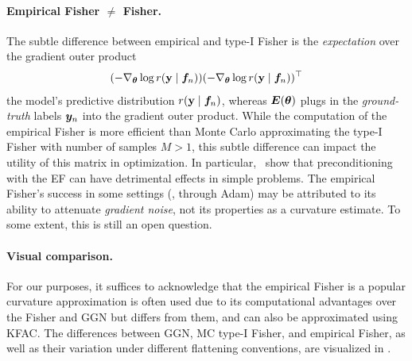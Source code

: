 \paragraph{Empirical Fisher $\neq$ Fisher.}
The subtle difference between empirical and type-I Fisher is the \emph{expectation} over the gradient outer product
\begin{align*}
  (-\nabla_{{\bm{\theta}}} \log r({\mathbf{y}} \mid {\bm{f}}_n))
  (-\nabla_{{\bm{\theta}}} \log r({\mathbf{y}} \mid {\bm{f}}_n))^{\top}
\end{align*}
\wrt the model's predictive distribution $r({\mathbf{y}} \mid {\bm{f}}_n)$, whereas ${\bm{E}}({\bm{\theta}})$ plugs in the \emph{ground-truth} labels ${\bm{y}}_n$ into the gradient outer product.
While the computation of the empirical Fisher is more efficient than Monte Carlo approximating the type-I Fisher with number of samples $M > 1$, this subtle difference can impact the utility of this matrix in optimization.
In particular,~\citet{kunstner2019limitations} show that preconditioning with the EF can have detrimental effects in simple problems.
The empirical Fisher's success in some settings (\eg, through Adam) may be attributed to its ability to attenuate \emph{gradient noise}, not its properties as a curvature estimate.
To some extent, this is still an open question.

\paragraph{Visual comparison.} For our purposes, it suffices to acknowledge that the empirical Fisher is a popular curvature approximation is often used due to its computational advantages over the Fisher and GGN but differs from them, and can also be approximated using KFAC.
The differences between GGN, MC type-I Fisher, and empirical Fisher, as well as their variation under different flattening conventions, are visualized in .

